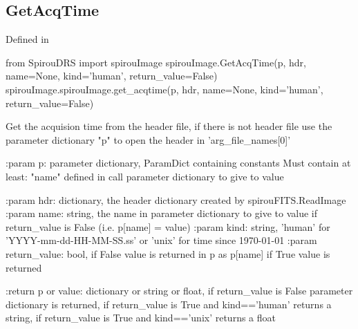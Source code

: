 \noindent\begin{minipage}{\textwidth}
\subsection{GetAcqTime}

Defined in \spirouImage{}

\begin{pythonbox}
from SpirouDRS import spirouImage
spirouImage.GetAcqTime(p, hdr, name=None, kind='human', return_value=False)
spirouImage.spirouImage.get_acqtime(p, hdr, name=None, kind='human', return_value=False)
\end{pythonbox}

\begin{pythondocstring}
Get the acquision time from the header file, if there is not header file
use the parameter dictionary "p" to open the header in 'arg_file_names[0]'

:param p: parameter dictionary, ParamDict containing constants
    Must contain at least:
        "name" defined in call
        parameter dictionary to give to value

:param hdr: dictionary, the header dictionary created by
            spirouFITS.ReadImage
:param name: string, the name in parameter dictionary to give to value
             if return_value is False (i.e. p[name] = value)
:param kind: string, 'human' for 'YYYY-mm-dd-HH-MM-SS.ss' or 'unix'
             for time since 1970-01-01
:param return_value: bool, if False value is returned in p as p[name]
                     if True value is returned

:return p or value: dictionary or string or float, if return_value is False
                    parameter dictionary is returned, if return_value is
                    True and kind=='human' returns a string, if return_value
                    is True and kind=='unix' returns a float
\end{pythondocstring}
\end{minipage}


